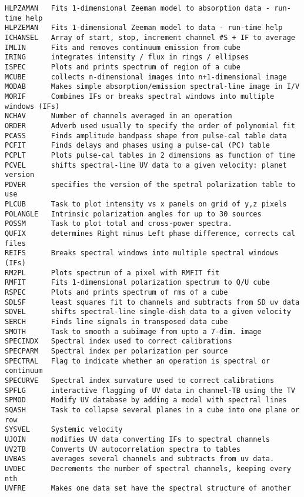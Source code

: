 \begin{verbatim}
HLPZAMAN   Fits 1-dimensional Zeeman model to absorption data - run-time help
HLPZEMAN   Fits 1-dimensional Zeeman model to data - run-time help
ICHANSEL   Array of start, stop, increment channel #S + IF to average
IMLIN      Fits and removes continuum emission from cube
IRING      integrates intensity / flux in rings / ellipses
ISPEC      Plots and prints spectrum of region of a cube
MCUBE      collects n-dimensional images into n+1-dimensional image
MODAB      Makes simple absorption/emission spectral-line image in I/V
MORIF      Combines IFs or breaks spectral windows into multiple windows (IFs)
NCHAV      Number of channels averaged in an operation
ORDER      Adverb used usually to specify the order of polynomial fit
PCASS      Finds amplitude bandpass shape from pulse-cal table data
PCFIT      Finds delays and phases using a pulse-cal (PC) table
PCPLT      Plots pulse-cal tables in 2 dimensions as function of time
PCVEL      shifts spectral-line UV data to a given velocity: planet version
PDVER      specifies the version of the spetral polarization table to use
PLCUB      Task to plot intensity vs x panels on grid of y,z pixels
POLANGLE   Intrinsic polarization angles for up to 30 sources
POSSM      Task to plot total and cross-power spectra.
QUFIX      determines Right minus Left phase difference, corrects cal files
REIFS      Breaks spectral windows into multiple spectral windows (IFs)
RM2PL      Plots spectrum of a pixel with RMFIT fit
RMFIT      Fits 1-dimensional polarization spectrum to Q/U cube
RSPEC      Plots and prints spectrum of rms of a cube
SDLSF      least squares fit to channels and subtracts from SD uv data
SDVEL      shifts spectral-line single-dish data to a given velocity
SERCH      Finds line signals in transposed data cube
SMOTH      Task to smooth a subimage from upto a 7-dim. image
SPECINDX   Spectral index used to correct calibrations
SPECPARM   Spectral index per polarization per source
SPECTRAL   Flag to indicate whether an operation is spectral or continuum
SPECURVE   Spectral index survature used to correct calibrations
SPFLG      interactive flagging of UV data in channel-TB using the TV
SPMOD      Modify UV database by adding a model with spectral lines
SQASH      Task to collapse several planes in a cube into one plane or row
SYSVEL     Systemic velocity
UJOIN      modifies UV data converting IFs to spectral channels
UV2TB      Converts UV autocorrelation spectra to tables
UVBAS      averages several channels and subtracts from uv data.
UVDEC      Decrements the number of spectral channels, keeping every nth
UVFRE      Makes one data set have the spectral structure of another

\end{verbatim}

